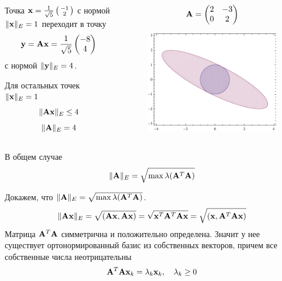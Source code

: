 \documentclass[professionalfonts,compress,unicode]{beamer}
\begin{document}
{
\begin{columns}[T]
\begin{column}{0.6\textwidth}
Точка 
${\bf x} = \frac{1}{\sqrt{5}}\left(\begin{smallmatrix}
	-1\\2
\end{smallmatrix}\right)$
 с нормой $\|{\bf x}\|_E = 1$ переходит в точку $${\bf y} = {\bf A}{\bf x} = \frac{1}{\sqrt{5}}\begin{pmatrix}
	-8\\4
\end{pmatrix}$$
 с нормой $\|{\bf y}\|_E = 4$. 

Для остальных точек $\|{\bf x}\|_E = 1$ 
$$\|{\bf A}{\bf x}\|_E \leq 4$$
$$
\|{\bf A}\|_E = 4
$$
\end{column}

\begin{column}{0.4\textwidth}
$$
{\bf A} = \begin{pmatrix}
	2&-3\\
	0&2
\end{pmatrix}
$$
\begin{figure}%
\includegraphics[width=\columnwidth]{euclid.pdf}%
\end{figure}
\end{column}
\end{columns}
\begin{block}{В общем случае}
$$
\|{\bf A}\|_E = \sqrt{\max \lambda({\bf A}^T{\bf A})}
$$
\end{block}
}

{
	Докажем, что $\|{\bf A}\|_E = \sqrt{\max \lambda({\bf A}^T{\bf A})}$.
	$$
	\|{\bf A}{\bf x}\|_E = \sqrt{({\bf A}{\bf x},{\bf A}{\bf x})} = \sqrt{{\bf x}^T{\bf A}^T{\bf A}{\bf x}} = \sqrt{({\bf x},{\bf A}^T{\bf A}{\bf x})}
	$$
	\pause
	Матрица ${\bf A}^T{\bf A}$ симметрична и положительно определена. Значит у нее 
	существует ортонормированный базис из собственных векторов, 
	причем все собственные числа неотрицательны
	$$
	{\bf A}^T{\bf A} {\bf x}_k = \lambda_k {\bf x}_k, \quad \lambda_k \geq 0
	$$
}
\end{document}
